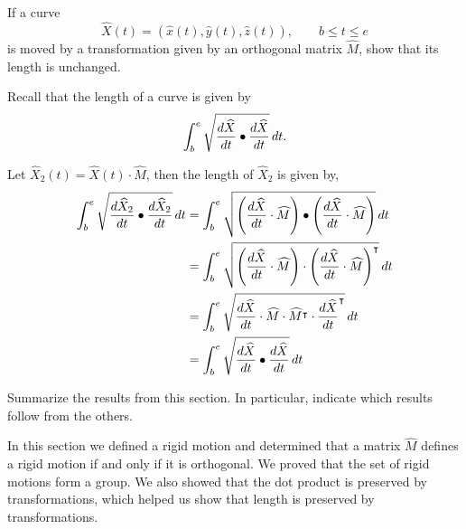 \documentclass{ximera}
\begin{document}
\begin{problem}
If a curve
\[
\hat{X}(t) = \left(\hat{x}(t),\hat{y}(t),\hat{z}(t)\right),\qquad b\le t\le e
\]
is moved by a transformation given by an orthogonal matrix $\hat{M}$,
show that its length is unchanged.
\begin{hint}
  Recall that the length of a curve is given by
\[
\int_{b}^{e} \sqrt{\frac{d\widehat{X}}{dt} \bullet \frac{d\widehat{X}}{dt}}\,d t.
\]  
\end{hint}

\begin{freeResponse}
Let $\hat{X}_{2}(t) = \hat{X}(t) \cdot \hat{M}$, then the length of $\hat{X}_{2}$ is given by,
\begin{align*}
\int_{b}^{e} \sqrt{\frac{d\widehat{X}_{2}}{dt} \bullet \frac{d\widehat{X}_{2}}{dt}}\,d t 
	&= \int_{b}^{e} \sqrt{ \left( \frac{d\widehat{X}}{dt} \cdot \widehat{M} \right) \bullet 
	\left( \frac{d\widehat{X}}{dt} \cdot \widehat{M} \right)}\,d t \\
	&= \int_{b}^{e} \sqrt{ \left( \frac{d\widehat{X}}{dt} \cdot \widehat{M} \right) \cdot 
	\left( \frac{d\widehat{X}}{dt} \cdot \widehat{M} \right)^\intercal}\,d t \\
	&= \int_{b}^{e} \sqrt{ \frac{d\widehat{X}}{dt} \cdot \widehat{M} \cdot 
	 \widehat{M}^\intercal \cdot \frac{d\widehat{X}}{dt}^\intercal}\,d t \\
	 &= \int_{b}^{e} \sqrt{ \frac{d\widehat{X}}{dt} \bullet \frac{d\widehat{X}}{dt}}\,d t
\end{align*}
\end{freeResponse}
\end{problem}


\begin{problem}
Summarize the results from this section. In particular, indicate which
results follow from the others.
\begin{freeResponse}
In this section we defined a rigid motion and determined that a matrix $\hat{M}$ defines a rigid motion if and only if it is orthogonal.  We proved that the set of rigid motions form a group. We also showed that the dot product is preserved by transformations, which helped us show that length is preserved by transformations. 
\end{freeResponse}
\end{problem}
\end{document}

